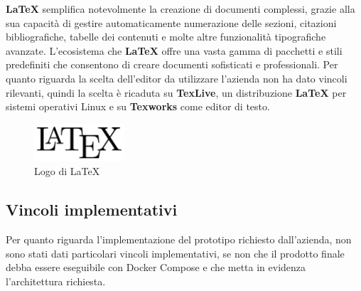 \noindent \textbf{LaTeX} semplifica notevolmente la creazione di documenti complessi, grazie alla sua capacità di gestire automaticamente numerazione delle sezioni, citazioni bibliografiche, tabelle dei contenuti e molte altre funzionalità tipografiche avanzate.
L'ecosistema che \textbf{LaTeX} offre una vasta gamma di pacchetti e stili predefiniti che consentono di creare documenti sofisticati e professionali.
Per quanto riguarda la scelta dell'editor da utilizzare l'azienda non ha dato vincoli rilevanti, quindi la scelta è ricaduta su \textbf{TexLive}, un distribuzione \textbf{LaTeX} per sistemi operativi Linux e su \textbf{Texworks} come editor di testo.
\begin{figure}[h]
    \centering
    \includegraphics[width=0.3\textwidth]{images/tecnologie/logo_latex.png}
    \caption{Logo di LaTeX}
    \label{fig:latex}
\end{figure}
\subsection{Vincoli implementativi}
Per quanto riguarda l'implementazione del prototipo richiesto dall'azienda, non sono stati dati particolari vincoli implementativi,
se non che il prodotto finale debba essere eseguibile con Docker Compose e che metta in evidenza l'architettura richiesta. 
\newpage
\pagestyle{empty}
\null %
\newpage